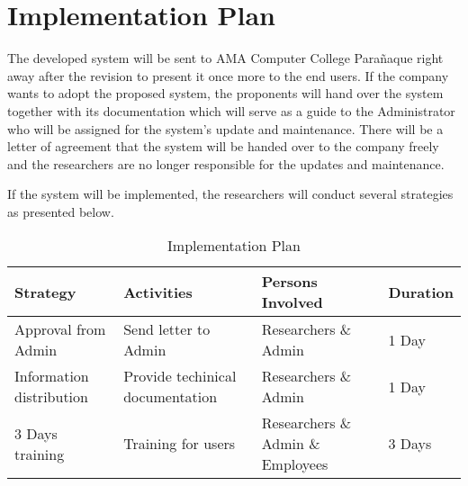 \section{Implementation Plan}

The developed system will be sent to AMA Computer College Parañaque right away after the revision to present it once more to the end users.
If the company wants to adopt the proposed system, the proponents will hand over the system together with its documentation which will serve as a guide to the Administrator who will be assigned for the system's update and maintenance.
There will be a letter of agreement that the system will be handed over to the company freely and the researchers are no longer responsible for the updates and maintenance.

If the system will be implemented, the researchers will conduct several strategies as presented below.

\vspace{1cm}

\begin{table}[h!]
   \begin{center}
      \begin{tabular}{|m{10em}|m{8em}|m{10em}|m{4em}|}
         \hline
         \textbf{Strategy}        & \textbf{Activities}              & \textbf{Persons Involved}         & \textbf{Duration} \\
         \hline
         Approval from Admin      & Send letter to Admin             & Researchers \& Admin              & 1 Day             \\
         \hline
         Information distribution & Provide techinical documentation & Researchers \& Admin              & 1 Day             \\
         \hline
         3 Days training          & Training for users               & Researchers \& Admin \& Employees & 3 Days            \\
         \hline
      \end{tabular}
   \end{center}

   \caption{Implementation Plan}
\end{table}

